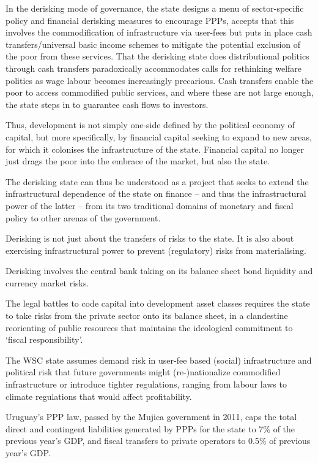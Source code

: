 \documentclass[
]{book}
\begin{document}
In the derisking mode of governance, the state designs a menu of sector-specific policy
and financial derisking measures to encourage PPPs, accepts that this involves the
commodification of infrastructure via user-fees but puts in place cash
transfers/universal basic income schemes to mitigate the potential exclusion of the poor
from these services. That the derisking state does distributional politics through cash
transfers paradoxically accommodates calls for rethinking welfare politics as wage
labour becomes increasingly precarious.
Cash transfers enable the poor to access commodified public services,
and where these are not large enough, the state steps in to guarantee cash flows to investors.

Thus, development is not simply one-side defined by the political economy of capital,
but more specifically, by financial capital seeking to expand to new
areas, for which it colonises the infrastructure of the state. Financial capital no longer
just drags the poor into the embrace of the market, but also the state.

The derisking state can thus be understood as a project that seeks to extend the
infrastructural dependence of the state on finance -- and thus the infrastructural power
of the latter -- from its two traditional domains of monetary and fiscal policy to other
arenas of the government.

Derisking is not just about the transfers of risks to the state.
It is also about exercising infrastructural power to prevent
(regulatory) risks from materialising.

Derisking involves the central bank taking on its balance sheet bond liquidity and
currency market risks.

The legal battles to code capital into development asset
classes requires the state to take risks from the private sector onto its balance sheet, in
a clandestine reorienting of public resources that maintains the ideological commitment
to `fiscal responsibility'.

The WSC state assumes demand risk in user-fee based (social) infrastructure and
political risk that future governments might (re-)nationalize commodified
infrastructure or introduce tighter regulations, ranging from labour laws to climate
regulations that would affect profitability.

Uruguay's PPP law, passed by the
Mujica government in 2011, caps the total direct and contingent liabilities generated by
PPPs for the state to 7\% of the previous year's GDP, and fiscal transfers to private
operators to 0.5\% of previous year's GDP.
\end{document}
